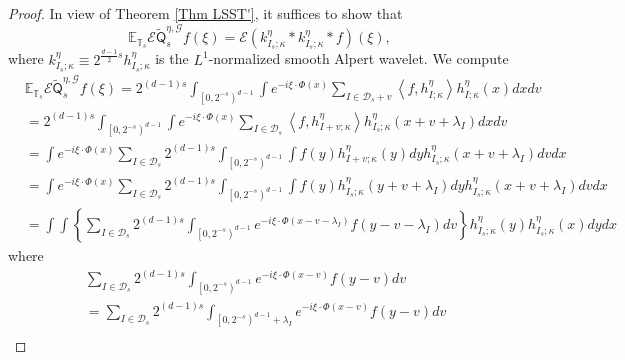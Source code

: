 \documentclass{amsart}%
\theoremstyle{plain}
\numberwithin{equation}{section}
\begin{document}
\begin{proof}
In view of Theorem \ref{Thm LSST'}, it suffices to show that
\[
\mathbb{E}_{\mathbb{T}_{s}}\mathcal{E}\widetilde{\mathsf{Q}}_{s}%
^{\eta,\mathcal{G}}f\left(  \xi\right)  =\mathcal{E}\left(  k_{I_{s};\kappa
}^{\eta}\ast k_{I_{s};\kappa}^{\eta}\ast f\right)  \left(  \xi\right)  ,
\]
where $k_{I_{s};\kappa}^{\eta}\equiv2^{\frac{d-1}{2}s}h_{I_{s};\kappa}^{\eta}$
is the $L^{1}$-normalized smooth Alpert wavelet. We compute%
\begin{align*}
& \mathbb{E}_{\mathbb{T}_{s}}\mathcal{E}\widetilde{\mathsf{Q}}_{s}%
^{\eta,\mathcal{G}}f\left(  \xi\right)  =2^{\left(  d-1\right)  s}%
\int_{\left[  0,2^{-s}\right)  ^{d-1}}\int e^{-i\xi\cdot\Phi\left(  x\right)
}\sum_{I\in\mathcal{D}_{s}+v}\left\langle f,h_{I;\kappa}^{\eta}\right\rangle
h_{I;\kappa}^{\eta}\left(  x\right)  dxdv\\
& =2^{\left(  d-1\right)  s}\int_{\left[  0,2^{-s}\right)  ^{d-1}}\int
e^{-i\xi\cdot\Phi\left(  x\right)  }\sum_{I\in\mathcal{D}_{s}}\left\langle
f,h_{I+v;\kappa}^{\eta}\right\rangle h_{I_{s};\kappa}^{\eta}\left(
x+v+\lambda_{I}\right)  dxdv\\
& =\int e^{-i\xi\cdot\Phi\left(  x\right)  }\sum_{I\in\mathcal{D}_{s}%
}2^{\left(  d-1\right)  s}\int_{\left[  0,2^{-s}\right)  ^{d-1}}\int f\left(
y\right)  h_{I+v;\kappa}^{\eta}\left(  y\right)  dyh_{I_{s};\kappa}^{\eta
}\left(  x+v+\lambda_{I}\right)  dvdx\\
& =\int e^{-i\xi\cdot\Phi\left(  x\right)  }\sum_{I\in\mathcal{D}_{s}%
}2^{\left(  d-1\right)  s}\int_{\left[  0,2^{-s}\right)  ^{d-1}}\int f\left(
y\right)  h_{I_{s};\kappa}^{\eta}\left(  y+v+\lambda_{I}\right)
dyh_{I_{s};\kappa}^{\eta}\left(  x+v+\lambda_{I}\right)  dvdx\\
& =\int\int\left\{  \sum_{I\in\mathcal{D}_{s}}2^{\left(  d-1\right)  s}%
\int_{\left[  0,2^{-s}\right)  ^{d-1}}e^{-i\xi\cdot\Phi\left(  x-v-\lambda
_{I}\right)  }f\left(  y-v-\lambda_{I}\right)  dv\right\}  h_{I_{s};\kappa
}^{\eta}\left(  y\right)  h_{I_{s};\kappa}^{\eta}\left(  x\right)  dydx
\end{align*}
where%
\begin{align*}
& \sum_{I\in\mathcal{D}_{s}}2^{\left(  d-1\right)  s}\int_{\left[
0,2^{-s}\right)  ^{d-1}}e^{-i\xi\cdot\Phi\left(  x-v\right)  }f\left(
y-v\right)  dv\\
& =\sum_{I\in\mathcal{D}_{s}}2^{\left(  d-1\right)  s}\int_{\left[
0,2^{-s}\right)  ^{d-1}+\lambda_{I}}e^{-i\xi\cdot\Phi\left(  x-v\right)
}f\left(  y-v\right)  dv\\

\end{align*}
\end{proof}
\end{document}
